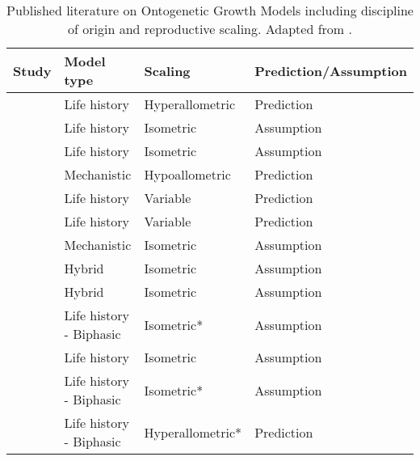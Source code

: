 \documentclass[a4paper]{article} %
\begin{document}
\begin{table}[H]
    \caption{Published literature on Ontogenetic Growth Models including discipline of origin and reproductive scaling. Adapted from \textcite{Barneche2018-reproductive_output}.}
    \begin{tabular}{|l|l|l|l|}
    \hline
    \textbf{Study}                      & \textbf{Model type}       & \textbf{Scaling} & \textbf{Prediction/Assumption} \\ \hline
    \textcite{Gadgil1970}                   & Life history              & Hyperallometric  & Prediction                     \\ \hline
    \textcite{Roff1983}                     & Life history              & Isometric        & Assumption                     \\ \hline
    \textcite{Roff1984}                     & Life history              & Isometric        & Assumption                     \\ \hline
    \textcite{Reiss1985}                    & Mechanistic               & Hypoallometric   & Prediction                     \\ \hline
    \textcite{Kozowski1987-indeterminate}   & Life history              & Variable         & Prediction                     \\ \hline
    \textcite{kozlowski1996}                & Life history              & Variable         & Prediction                     \\ \hline
    \textcite{West2001}                     & Mechanistic               & Isometric        & Assumption                     \\ \hline
    \textcite{Charnov2001}                  & Hybrid                    & Isometric        & Assumption                     \\ \hline
    \textcite{Charnov2002}                  & Hybrid                    & Isometric        & Assumption                     \\ \hline
    \textcite{Lester2004}                   & Life history - Biphasic   & Isometric*       & Assumption                     \\ \hline
    \textcite{Roff2006}                     & Life history              & Isometric        & Assumption                     \\ \hline
    \textcite{Quince2008}                   & Life history - Biphasic   & Isometric*       & Assumption                     \\ \hline
    \textcite{Quince2008b}                  & Life history - Biphasic   & Hyperallometric* & Prediction                     \\ \hline

\end{tabular}
\end{table}
\end{document}
